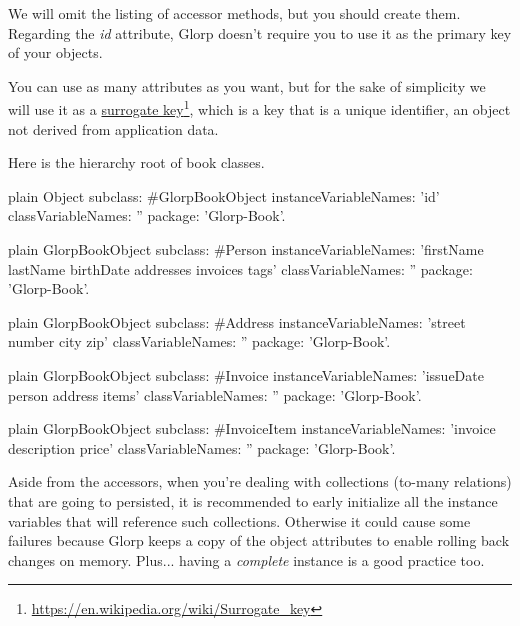 \documentclass[10pt,twoside,english]{_support/latex/sbabook/sbabook}
\begin{document}
We will omit the listing of accessor methods, but you should create them.
Regarding the \textit{id} attribute, Glorp doesn't require you to use it as
the primary key of your objects.

You can use as many attributes as you want, but for the sake of simplicity we
will use it as a \href{https://en.wikipedia.org/wiki/Surrogate_key}{surrogate key}\footnote{\url{https://en.wikipedia.org/wiki/Surrogate_key}},
which is a key that is a unique identifier, an object not derived from
application data.

Here is the hierarchy root of book classes.

\begin{displaycode}{plain}
Object subclass: #GlorpBookObject
	instanceVariableNames: 'id'
	classVariableNames: ''
	package: 'Glorp-Book'.
\end{displaycode}

\begin{displaycode}{plain}
GlorpBookObject subclass: #Person
	instanceVariableNames: 'firstName lastName birthDate addresses invoices tags'
	classVariableNames: ''
	package: 'Glorp-Book'.
\end{displaycode}

\begin{displaycode}{plain}
GlorpBookObject subclass: #Address
	instanceVariableNames: 'street number city zip'
	classVariableNames: ''
	package: 'Glorp-Book'.
\end{displaycode}

\begin{displaycode}{plain}
GlorpBookObject subclass: #Invoice
	instanceVariableNames: 'issueDate person address items'
	classVariableNames: ''
	package: 'Glorp-Book'.
\end{displaycode}

\begin{displaycode}{plain}
GlorpBookObject subclass: #InvoiceItem
	instanceVariableNames: 'invoice description price'
	classVariableNames: ''
	package: 'Glorp-Book'.
\end{displaycode}

Aside from the accessors, when you're dealing with collections
(to-many relations) that are going to persisted, it is recommended to
early initialize all the instance variables that will reference such collections.
Otherwise it could cause some failures because Glorp keeps a copy of the object
attributes to enable rolling back changes on memory. Plus... having a \textit{complete}
instance is a good practice too.
\end{document}
